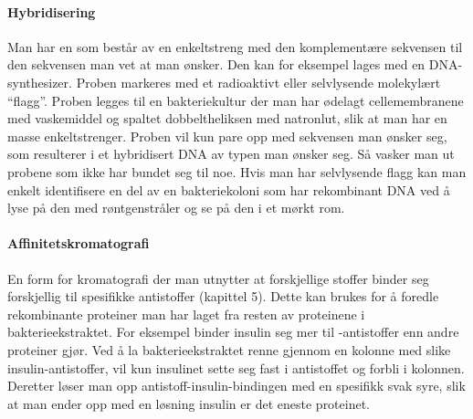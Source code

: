 \paragraph{Hybridisering} Man har en  som består av en enkeltstreng med den komplementære sekvensen til den sekvensen man vet at man ønsker. Den kan for eksempel lages med en DNA-synthesizer. Proben markeres med et radioaktivt eller selvlysende molekylært ``flagg''. Proben legges til en bakteriekultur der man har ødelagt cellemembranene med vaskemiddel og spaltet dobbeltheliksen med natronlut, slik at man har en masse enkeltstrenger. Proben vil kun pare opp med sekvensen man ønsker seg, som resulterer i et hybridisert DNA av typen man ønsker seg. Så vasker man ut probene som ikke har bundet seg til noe. Hvis man har selvlysende flagg kan man enkelt identifisere en del av en bakteriekoloni som har rekombinant DNA ved å lyse på den med røntgenstråler og se på den i et mørkt rom.

\paragraph{Affinitetskromatografi} En form for kromatografi der man utnytter at forskjellige stoffer binder seg forskjellig til spesifikke antistoffer (kapittel 5). Dette kan brukes for å foredle rekombinante proteiner man har laget fra resten av proteinene i bakterieekstraktet. For eksempel binder insulin seg mer til -antistoffer enn andre proteiner gjør. Ved å la bakterieekstraktet renne gjennom en kolonne med slike insulin-antistoffer, vil kun insulinet sette seg fast i antistoffet og forbli i kolonnen. Deretter løser man opp antistoff-insulin-bindingen med en spesifikk svak syre, slik at man ender opp med en løsning insulin er det eneste proteinet. 

